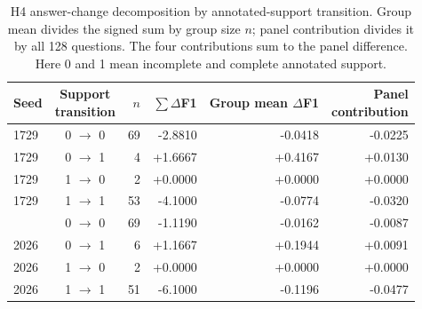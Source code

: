 \begin{table}[!htbp]
\centering\small
\caption{H4 answer-change decomposition by annotated-support transition. Group mean divides the signed sum by group size $n$; panel contribution divides it by all 128 questions. The four contributions sum to the panel difference. Here 0 and 1 mean incomplete and complete annotated support.}\label{tab:decomp}
\begin{tabular}{@{}lcrrrr@{}}\toprule
Seed & \shortstack{Support\\transition} & $n$ & $\sum\Delta$F1 & \shortstack{Group mean\\$\Delta$F1} & \shortstack{Panel\\contribution} \\
\midrule
1729 & 0 $\to$ 0 & 69 & -2.8810 & -0.0418 & -0.0225 \\
1729 & 0 $\to$ 1 & 4 & +1.6667 & +0.4167 & +0.0130 \\
1729 & 1 $\to$ 0 & 2 & +0.0000 & +0.0000 & +0.0000 \\
1729 & 1 $\to$ 1 & 53 & -4.1000 & -0.0774 & -0.0320 \\
\addlinespace 2026 & 0 $\to$ 0 & 69 & -1.1190 & -0.0162 & -0.0087 \\
2026 & 0 $\to$ 1 & 6 & +1.1667 & +0.1944 & +0.0091 \\
2026 & 1 $\to$ 0 & 2 & +0.0000 & +0.0000 & +0.0000 \\
2026 & 1 $\to$ 1 & 51 & -6.1000 & -0.1196 & -0.0477 \\
\bottomrule\end{tabular}
\end{table}
